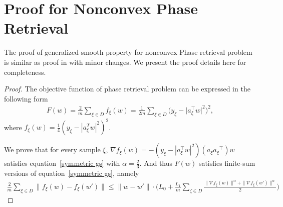 \documentclass[10pt]{article} %
\def\eqref#1{equation~\ref{#1}}
\newtheorem{proof}{Proof}
\begin{document}
\section{Proof for Nonconvex Phase Retrieval}\label{Appendix C}
The proof of generalized-smooth property for nonconvex Phase retrieval problem is similar as proof in \citet{pmlr-v202-chen23ar} with minor changes. We present the proof details here for completeness.  
\begin{proof}\label{proof of Phase Retrieval}
The objective function of phase retrieval problem can be expressed in the following form
\begin{align}
    F(w)=\frac{2}{m}\sum_{\xi \in D}f_{\xi}(w)=\frac{1}{2m}\sum_{\xi \in D}\big(y_{\xi}-\big|a_{\xi}^{\top} w\big|^2\big)^2,
    \label{phase retrieval objective}
\end{align}
where $f_{\xi}(w)=\frac{1}{4}(y_{\xi}-|a_{\xi}^Tw|^2)^2$.

We prove that for every sample $\xi$, $\nabla f_{\xi}(w)=-(y_{\xi}-|a_{\xi}^{\top}w|^2)(a_{\xi}{a_{\xi}}^{\top})w$ satisfies \eqref{symmetric gs} with $\alpha=\frac{2}{3}$. And thus $F(w)$ satisfies finite-sum versions of \eqref{symmetric gs}, namely
\begin{align}
    \frac{2}{m}\sum_{\xi\in D}\big\| f_{\xi}(w)-f_{\xi}(w')\big\|\leq \big \| w-w'\big \|\cdot\Big(L_0+\frac{L_1}{m}\sum_{\zeta\in D}\frac{\|\nabla f_{\xi}(w)\|^{\alpha}+\|\nabla f_{\xi}(w')\|^{\alpha}}{2}\Big)
    \label{symmetric gs stochastic}
\end{align}


\end{proof}
\end{document}
